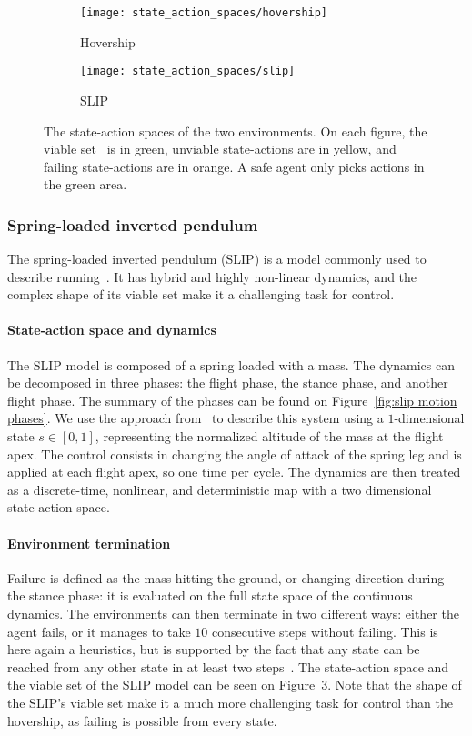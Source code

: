 \begin{figure}[t]
	\centering
	\begin{subfigure}{0.45\textwidth}
		\centering
		\texttt{[image: state\_action\_spaces/hovership]}
		\caption{Hovership}
		\label{fig:state action spaces:hovership}
	\end{subfigure}
	\begin{subfigure}{0.45\textwidth}
		\centering
		\texttt{[image: state\_action\_spaces/slip]}
		\caption{SLIP}
		\label{fig:state action spaces:slip}
	\end{subfigure}
	\caption{The state-action spaces of the two environments. On each figure, the viable set \QV~is in green, unviable state-actions are in yellow, and failing state-actions are in orange. A safe agent only picks actions in the green area.}
\end{figure}

\subsubsection{Spring-loaded inverted pendulum} 
The spring-loaded inverted pendulum (SLIP) is a model commonly used to describe running~\cite{heim2019beyond}. It has hybrid and highly non-linear dynamics, and the complex shape of its viable set make it a challenging task for control.

\paragraph{State-action space and dynamics} The SLIP model is composed of a spring loaded with a mass. The dynamics can be decomposed in three phases: the flight phase, the stance phase, and another flight phase. The summary of the phases can be found on Figure~\ref{fig:slip motion phases}. We use the approach from~\cite{heim2019beyond} to describe this system using a $1$-dimensional state $s\in[0,1]$, representing the normalized altitude of the mass at the flight apex. The control consists in changing the angle of attack of the spring leg and is applied at each flight apex, so one time per cycle. The dynamics are then treated as a discrete-time, nonlinear, and deterministic map with a two dimensional state-action space.

\paragraph{Environment termination} Failure is defined as the mass hitting the ground, or changing direction during the stance phase: it is evaluated on the full state space of the continuous dynamics. The environments can then terminate in two different ways: either the agent fails, or it manages to take $10$ consecutive steps without failing. This is here again a heuristics, but is supported by the fact that any state can be reached from any other state in at least two steps~\cite{zaytsev2015two}. The state-action space and the viable set of the SLIP model can be seen on Figure~\ref{fig:state action spaces:slip}. Note that the shape of the SLIP's viable set make it a much more challenging task for control than the hovership, as failing is possible from every state.

